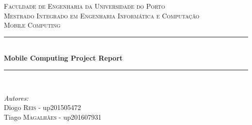 \documentclass[12pt]{article}
\begin{document}
\begin{titlepage}

\newcommand{\HRule}{\rule{\linewidth}{0.25mm}} %

\center %


\textsc{\LARGE Faculdade de Engenharia da Universidade do Porto}\\[0.5cm] %
\textsc{\Large Mestrado Integrado em Engenharia Informática e Computação}\\[0.5cm] %
\textsc{\large Mobile Computing}\\[0.5cm] %


\HRule \\[0.75cm]
{ \huge \bfseries Mobile Computing Project Report}\\[0.4cm] %
\HRule \\[1cm]


\begin{minipage}{0.6\textwidth}
\begin{flushleft} \large
\emph{Autores:}\\
Diogo \textsc{Reis} - up201505472\\
Tiago \textsc{Magalhães} - up201607931\\

\end{flushleft}
\end{minipage}
~
\begin{minipage}{0.35\textwidth}
\begin{flushright} \large
\end{flushright}
\end{minipage}\\[1cm]


\end{titlepage}
\end{document}

